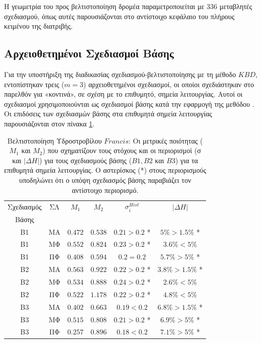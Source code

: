 Η γεωμετρία του προς βελτιστοποίηση δρομέα παραμετροποιείται με $336$ μεταβλητές σχεδιασμού, όπως αυτές παρουσιάζονται στο αντίστοιχο κεφάλαιο του πλήρους κειμένου της διατριβής. 


\subsection{Αρχειοθετημένοι Σχεδιασμοί Βάσης}
Για την υποστήριξη της διαδικασίας σχεδιασμού-βελτιστοποίησης με τη μέθοδο $KBD$, εντοπίστηκαν τρεις ($m\!=\!3$) αρχειοθετημένοι σχεδιασμοί, οι οποίοι σχεδιάστηκαν στο παρελθόν για «κοντινά», σε σχέση με το επιθυμητό, σημεία λειτουργίας. Αυτοί οι σχεδιασμοί χρησιμοποιούνται  ως σχεδιασμοί βάσης κατά την εφαρμογή της μεθόδου . Οι επιδόσεις των σχεδιασμών βάσης στα επιθυμητά σημεία λειτουργίας παρουσιάζονται στον πίνακα \ref{reuse}.

\begin{table}[h!]
\begin{center}
\begin{tabular}{ |c|c|c|c|c|c| }
\hline
Σχεδιασμός & ΣΛ & $M_1$ & $M_2$  & $\sigma_i^{Hist}$ & $|\Delta H|$\\
Βάσης & & & & &\\
\hline
Β1 & ΜΑ & $0.472$ & $0.538$ & $0.21 >0.2$ * & $ 5\% >1.5\%$ * \\
Β1 & ΜΦ & $0.552$ & $0.824$ & $0.23 > 0.2$ * & $ 3.6\% <5\%$ \\
Β1 & ΠΦ & $0.408$ & $0.594$ & $0.2 = 0.2$  & $ 5.7\% >5\%$ * \\
\hline
\hline
Β2 & ΜΑ & $0.563$ & $0.922$ & $0.22 > 0.2$ * & $ 3.8\% >1.5\%$ * \\
Β2 & ΜΦ & $0.534$ & $0.888$ & $0.24 > 0.2$ * & $ 2.6\% <5\%$  \\
Β2 & ΠΦ & $0.522$ & $1.178$ & $0.22 > 0.2$ * & $ 4.8\% <5\%$  \\
\hline
\hline
Β3 & ΜΑ & $0.402$ & $0.663$ & $0.19 < 0.2$  & $ 6.8\% >1.5\%$ * \\
Β3 & ΜΦ & $0.515$ & $0.808$ & $0.21 > 0.2$ * & $ 6.9\% >5\%$ * \\
Β3 & ΠΦ & $0.257$ & $0.896$ & $0.18 < 0.2$  & $ 7.1\% >5\%$ * \\
\hline
\end{tabular}
\caption{Βελτιστοποίηση Υδροστροβίλου $Francis$: Οι μετρικές ποιότητας ($M_1$ και $M_2$) που σχηματίζουν τους στόχους και οι περιορισμοί (σ και $|\Delta H|$) για τους σχεδιασμούς βάσης ($B1, B2$ και $B3$) για τα επιθυμητά σημεία λειτουργίας. Ο αστερίσκος (*) στους περιορισμούς υποδηλώνει ότι ο υπόψη σχεδιασμός βάσης παραβιάζει τον αντίστοιχο περιορισμό.}
\label{reuse}
\end{center}
\end{table}

